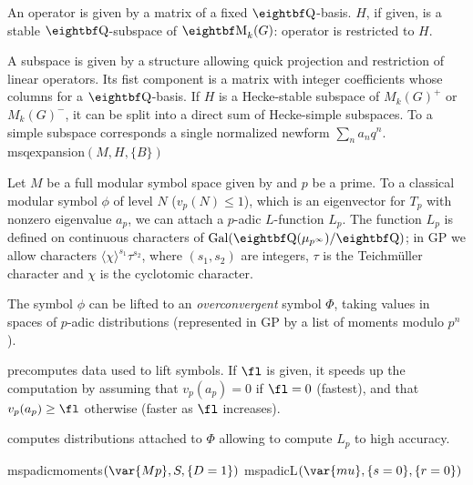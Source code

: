 An operator is given by a matrix of a fixed $\QQ$-basis. $H$, if given, is a
stable $\QQ$-subspace of $\MM_k(G)$: operator is restricted to $H$.\hfil\break
{}

 A subspace is given by a structure allowing
quick projection and restriction of linear operators. Its fist
component is a matrix with integer coefficients whose columns for a
$\QQ$-basis. If $H$ is a Hecke-stable subspace of $M_k(G)^+$ or $M_k(G)^-$,
it can be split into a direct sum of Hecke-simple subspaces.
To a simple subspace corresponds a single normalized newform
$\sum_n a_n q^n$.
\hfil\break
{}
   {msqexpansion$(M, H, \{B\})$}

\medskip
{}
Let $M$ be a full modular symbol space given by 
and $p$ be a prime. To a classical modular symbol $\phi$ of level $N$
($v_p(N)\leq 1$), which is an eigenvector for $T_p$ with nonzero eigenvalue
$a_p$, we can attach a $p$-adic $L$-function $L_p$. The function $L_p$
is defined on continuous characters of $\text{Gal}(\QQ(\mu_{p^\infty})/\QQ)$;
in GP we allow characters $\langle \chi \rangle^{s_1} \tau^{s_2}$, where
$(s_1,s_2)$ are integers, $\tau$ is the Teichm\"uller character and $\chi$ is
the cyclotomic character.

The symbol $\phi$ can be lifted to an \emph{overconvergent} symbol $\Phi$,
taking values in spaces of $p$-adic distributions (represented in GP by a
list of moments modulo $p^n$).

 precomputes data used to lift symbols. If $\fl$ is given,
it speeds up the computation by assuming that $v_p(a_p) = 0$ if $\fl = 0$
(fastest), and that $v_p(a_p) \geq \fl$ otherwise (faster as $\fl$ increases).

 computes distributions  attached to $\Phi$
allowing to compute $L_p$ to high accuracy.

   {mspadicmoments$(\var{Mp}, S, \{D=1\})$}
   {mspadicL$(\var{mu}, \{s = 0\}, \{r = 0\})$}

\copyrightnotice
\bye
